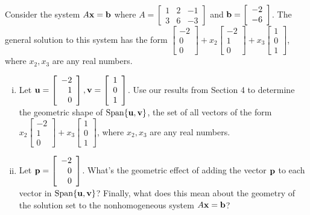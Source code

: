 \begin{activity}
\item Consider the system $A \mathbf{x} = \mathbf{b}$ where $A =\left[ \begin{array}{ccr} 1&2&-1 \\ 3&6&-3 \end{array} \right]$ and $\mathbf{b} =  \left[ \begin{array}{r} -2 \\ -6 \end{array} \right]$. The general solution to this system has the form $\left[ \begin{array}{r} -2 \\ 0 \\0 \end{array} \right] + x_2\left[ \begin{array}{r} -2 \\ 1 \\0 \end{array} \right] +x_3\left[ \begin{array}{c} 1 \\ 0 \\1 \end{array} \right] $, where $x_2, x_3$ are any real numbers. 

\begin{enumerate}[i.]
    \item Let $\mathbf{u} = \left[ \begin{array}{r} -2 \\ 1 \\0 \end{array} \right], \mathbf{v}= \left[ \begin{array}{c} 1 \\ 0 \\1 \end{array} \right]$. Use our results from Section 4 to determine the geometric shape of $\text{Span} \{\mathbf{u}, \mathbf{v}\}$, the set of all vectors of the form $x_2\left[ \begin{array}{r} -2 \\ 1 \\0 \end{array} \right] +x_3\left[ \begin{array}{c} 1 \\ 0 \\1 \end{array} \right]$, where $x_2, x_3$ are any real numbers. 

    

    \item Let $\mathbf{p} = \left[ \begin{array}{r} -2 \\ 0 \\0 \end{array} \right]$. What's the geometric effect of adding the vector $\mathbf{p}$ to each vector in $\text{Span} \{\mathbf{u}, \mathbf{v}\} $? Finally, what does this mean about the geometry of the solution set to the nonhomogeneous system $A \mathbf{x} = \mathbf{b}$?

\end{enumerate}

   \ea
\end{activity}




